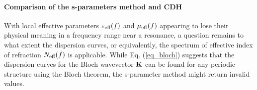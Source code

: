 \paragraph{Comparison of the s-parameters method and CDH}%
With local effective parameters $\varepsilon_{\text{eff} }(f)$ and $\mu_{\text{eff} }(f)$ appearing to lose their physical meaning in a frequency range near a resonance, a question remains to what extent the dispersion curves, or equivalently, the spectrum of effective index of refraction $N_{\text{eff} }(f)$ is applicable. While Eq. (\ref{eq_bloch}) suggests that the dispersion curves for the Bloch wavevector ${\mathbf{K}}$ can be found for any periodic structure using the Bloch theorem, the s-parameter method might return invalid values.

